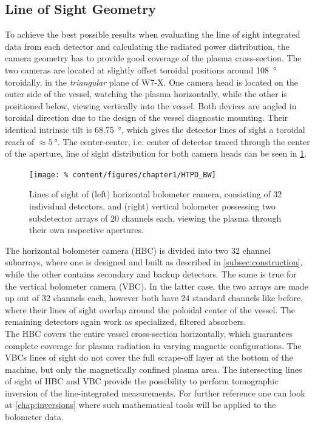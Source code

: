         \subsection{Line of Sight Geometry}\label{subsec:losgeometry}
%
            To achieve the best possible results when evaluating the line of sight integrated data from each detector and calculating the radiated power distribution, the camera geometry has to provide good coverage of the plasma cross-section. The two cameras are located at slightly offset toroidal positions around \SI{108}{\degree} toroidally, in the \textit{triangular} plane of W7-X. One camera head is located on the outer side of the vessel, watching the plasma horizontally, while the other is positioned below, viewing vertically into the vessel. Both devices are angled in toroidal direction due to the design of the vessel diagnostic mounting. Their identical intrinsic tilt is \SI{68.75}{\degree}, which gives the detector lines of sight a toroidal reach of $\approx\SI{5}{\degree}$. The center-center, i.e. center of detector traced through the center of the aperture, line of sight distribution for both camera heads can be seen in \cref{fig:los_vessel}.\\%
%
            \begin{figure}[t]%
                \centering%
                \texttt{[image: \%
                    content/figures/chapter1/HTPD\_BW]}%
                \caption{Lines of sight of (left) horizontal bolometer camera, consisting of 32 individual detectors, and (right) vertical bolometer possessing two subdetector arrays of 20 channels each, viewing the plasma through their own respective apertures.}\label{fig:los_vessel}%
            \end{figure}%
%
            The horizontal bolometer camera (HBC) is divided into two 32 channel subarrays, where one is designed and built as described in \cref{subsec:construction}, while the other contains secondary and backup detectors. The same is true for the vertical bolometer camera (VBC). In the latter case, the two arrays are made up out of 32 channels each, however both have 24 standard channels like before, where their lines of sight overlap around the poloidal center of the vessel. The remaining detectors again work as specialized, filtered absorbers.\\%
            The HBC covers the entire vessel cross-section horizontally, which guarantees complete coverage for plasma radiation in varying magnetic configurations. The VBCs lines of sight do not cover the full scrape-off layer at the bottom of the machine, but only the magnetically confined plasma area. The intersecting lines of sight of HBC and VBC provide the possibility to perform tomographic inversion of the line-integrated measurements. For further reference one can look at \cref{chap:inversions} where such mathematical tools will be applied to the bolometer data.\\%
